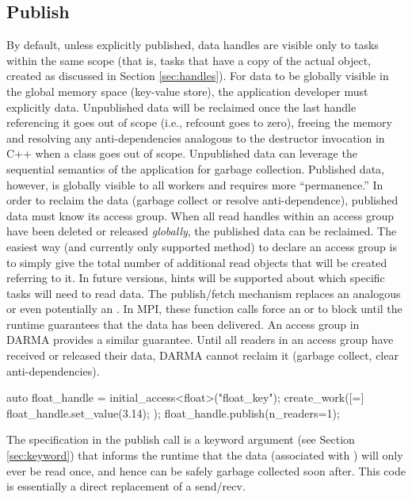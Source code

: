\subsection{Publish}
\label{subsec:publish}
By default, unless explicitly published, data handles are visible only to tasks
within the same scope (that is, tasks that have a copy of the actual
 object, created as discussed in
Section \ref{sec:handles}).
For data to be globally visible in the global memory space (key-value store),
the application developer must explicitly  data.  
Unpublished data will be reclaimed once the last handle referencing it goes out of scope (i.e., refcount goes to zero),
freeing the memory and resolving any anti-dependencies analogous to the
destructor invocation in C++ when a class goes out of scope.  
Unpublished data can leverage the sequential semantics of the application for garbage collection.  
Published data, however, is globally visible to all workers and requires more ``permanence.''  
In order to reclaim the data (garbage collect or resolve anti-dependence), published data must know its access group.
When all read handles within an access group have been deleted or released \emph{globally}, the published data can be reclaimed.
The easiest way (and currently only supported method) to declare an access group is
to simply give the total number of additional read  objects that will be created referring to it.
In future versions, hints will be supported about which specific tasks will need to read data.
The publish/fetch mechanism replaces an analogous  or even potentially an .
In MPI, these function calls force an  or  to block until the runtime guarantees that the data has
been delivered.
An access group in DARMA provides a similar guarantee.
Until all readers in an access group have received or released their data, DARMA cannot reclaim it (garbage collect, clear anti-dependencies).

\begin{CppCode}
auto float_handle = initial_access<float>("float_key");
create_work([=]{
  float_handle.set_value(3.14);
});
float_handle.publish(n_readers=1);
\end{CppCode}
The  specification in the publish call is a keyword
argument (see Section \ref{sec:keyword}) that informs the runtime that the data
(associated with ) will only ever be read once, and hence can be safely garbage collected soon after.  
This code is essentially a direct replacement of a send/recv.

